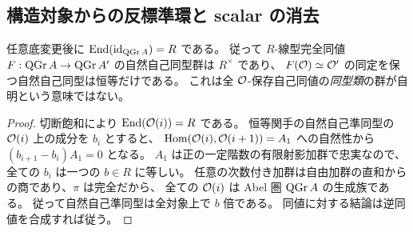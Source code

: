 \subsection{構造対象からの反標準環と scalar の消去}

\begin{corollary}[全同値の自然自己同型]
\label{mbsd:cor:natural-scalars}
任意底変更後に $\operatorname{End}(\operatorname{id}_{\operatorname{QGr} A})=R$ である。
従って $R$-線型完全同値 $F:\operatorname{QGr} A\to\operatorname{QGr} A'$ の自然自己同型群は $R^\times$ であり、
$F(\mathcal O)\simeq\mathcal O'$ の同定を保つ自然自己同型は恒等だけである。
これは全 $\mathcal O$-保存自己同値の\emph{同型類}の群が自明という意味ではない。
\end{corollary}
\begin{proof}
切断飽和により $\operatorname{End}(\mathcal O(i))=R$ である。
恒等関手の自然自己準同型の $\mathcal O(i)$ 上の成分を $b_i$ とすると、
$\operatorname{Hom}(\mathcal O(i),\mathcal O(i+1))=A_1$ への自然性から
$(b_{i+1}-b_i)A_1=0$ となる。
$A_1$ は正の一定階数の有限射影加群で忠実なので、全ての $b_i$ は一つの $b\in R$ に等しい。
任意の次数付き加群は自由加群の直和からの商であり、$\pi$ は完全だから、
全ての $\mathcal O(i)$ は Abel 圏 $\operatorname{QGr} A$ の生成族である。
従って自然自己準同型は全対象上で $b$ 倍である。
同値に対する結論は逆同値を合成すれば従う。
\end{proof}

